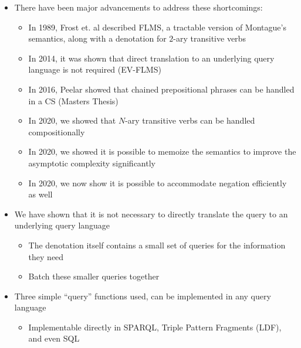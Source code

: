 \documentclass[logoontitle,tabu,supertabular,aspectratio=43]{preney-uwindsor-beamer}
\begin{document}
	\begin{frame}{\insertsection}
		\begin{itemize}
			\item There have been major advancements to address these shortcomings:
			\begin{itemize}
			\item In 1989, Frost et. al described FLMS, a tractable version of Montague's semantics, along with a denotation for $2$-ary transitive verbs \cite{frost1989constructing}
			\item In 2014, it was shown that direct translation to an underlying query language is not required (EV-FLMS) \cite{frost2014denotational}
			\item In 2016, Peelar showed that chained prepositional phrases can be handled in a CS (Masters Thesis) \cite{peelar2016accommodating}
			\item In 2020, we showed that $N$-ary transitive verbs can be handled compositionally \cite{peelar2020compositional}
            \item In 2020, we showed it is possible to memoize the semantics to improve the asymptotic complexity significantly \cite{peelar2020webistjournal}
            \item In 2020, we now show it is possible to accommodate negation efficiently as well
			\end{itemize}
		\end{itemize}
	\end{frame}


	\begin{frame}{\insertsection}
		\begin{itemize}
			\item We have shown that it is not necessary to directly translate the query to an underlying query language \cite{frost2014demonstration}
			\begin{itemize}
				\item The denotation itself contains a small set of queries for the information they need
				\item Batch these smaller queries together
			\end{itemize}
			\item Three simple ``query'' functions used, can be implemented in any query language
			\begin{itemize}
				\item Implementable directly in SPARQL, Triple Pattern Fragments (LDF), and even SQL
			\end{itemize}
		\end{itemize}
	\end{frame}
\end{document}
